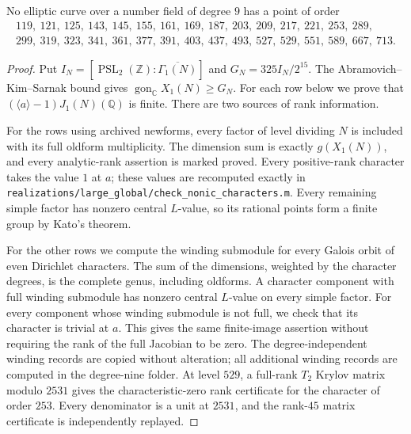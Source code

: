 \begin{proposition}\label{prop:nonic-large-global}
No elliptic curve over a number field of degree $9$ has a point of order
\[
\begin{gathered}
119,\ 121,\ 125,\ 143,\ 145,\ 155,\ 161,\ 169,\ 187,\ 203,\ 209,\ 217,\ 221,\ 253,\ 289,\\
299,\ 319,\ 323,\ 341,\ 361,\ 377,\ 391,\ 403,\ 437,\ 493,\ 527,\ 529,\ 551,\ 589,\ 667,\ 713.
\end{gathered}
\]
\end{proposition}
\begin{proof}
Put $I_N=[\operatorname{PSL}_2(\mathbb Z):\overline{\Gamma_1(N)}]$
and $G_N=325I_N/2^{15}$. The Abramovich--Kim--Sarnak bound gives
$\operatorname{gon}_{\mathbb C}X_1(N)\geq G_N$.
For each row below we prove that
$(\langle a\rangle-1)J_1(N)(\mathbb Q)$ is finite.
There are two sources of rank information.

For the rows using archived newforms, every factor of level dividing
$N$ is included with its full oldform multiplicity. The dimension sum
is exactly $g(X_1(N))$, and every analytic-rank assertion is marked
proved. Every positive-rank character takes the value $1$ at $a$;
these values are recomputed exactly in
\texttt{realizations/large\_global/check\_nonic\_characters.m}.
Every remaining simple factor has nonzero central $L$-value, so its
rational points form a finite group by Kato's theorem.

For the other rows we compute the winding submodule for every
Galois orbit of even Dirichlet characters. The sum of the dimensions,
weighted by the character degrees, is the complete genus, including
oldforms. A character component with full winding submodule has
nonzero central $L$-value on every simple factor. For every component
whose winding submodule is not full, we check that its character is
trivial at $a$. This gives the same finite-image assertion without
requiring the rank of the full Jacobian to be zero.
The degree-independent winding records are copied without alteration;
all additional winding records are computed in the degree-nine folder.
At level $529$, a full-rank $T_2$ Krylov matrix modulo $2531$ gives
the characteristic-zero rank certificate for the character of order
$253$. Every denominator is a unit at $2531$, and the rank-$45$
matrix certificate is independently replayed.


\end{proof}

